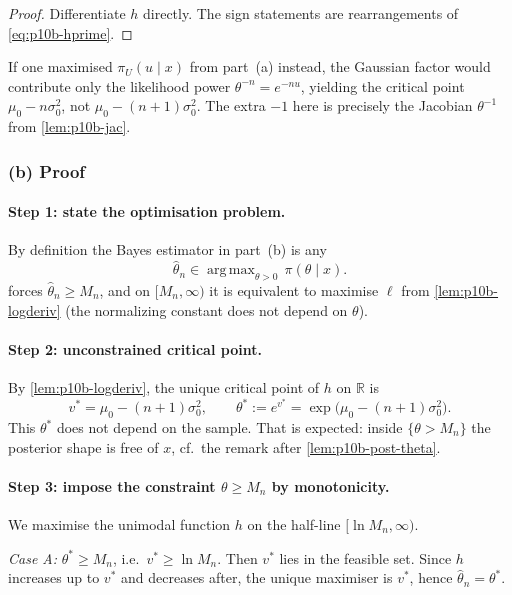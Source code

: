 \documentclass[11pt,a4paper]{article}
\DeclareMathOperator*{\argmax}{arg\,max}
\begin{document}
\begin{proof}
Differentiate \(h\) directly. The sign statements are rearrangements of \eqref{eq:p10b-hprime}.
\end{proof}

\begin{remark*}
If one maximised \(\pi_U(u\mid x)\) from part~(a) instead, the Gaussian factor would contribute only the likelihood power \(\theta^{-n}=e^{-nu}\), yielding the critical point \(\mu_0-n\sigma_0^2\), not \(\mu_0-(n+1)\sigma_0^2\). The extra \(-1\) here is precisely the Jacobian \(\theta^{-1}\) from \cref{lem:p10b-jac}.
\end{remark*}

\subsubsection{(b) Proof}

\paragraph{Step 1: state the optimisation problem.}
By definition the Bayes estimator in part~(b) is any
\[
\widehat\theta_n
\in
\argmax_{\theta>0}\,\pi(\theta\mid x).
\]
 forces \(\widehat\theta_n\ge M_n\), and on \([M_n,\infty)\) it is equivalent to maximise \(\ell\) from \cref{lem:p10b-logderiv} (the normalizing constant does not depend on \(\theta\)).

\paragraph{Step 2: unconstrained critical point.}
By \cref{lem:p10b-logderiv}, the unique critical point of \(h\) on \(\mathbb{R}\) is
\[
v^*=\mu_0-(n+1)\sigma_0^2,
\qquad
\theta^*
:=
e^{v^*}
=
\exp\bigl(\mu_0-(n+1)\sigma_0^2\bigr).
\]
This \(\theta^*\) does not depend on the sample. That is expected: inside \(\{\theta>M_n\}\) the posterior shape is free of \(x\), cf.\ the remark after \cref{lem:p10b-post-theta}.

\paragraph{Step 3: impose the constraint \(\theta\ge M_n\) by monotonicity.}
We maximise the unimodal function \(h\) on the half-line \([\ln M_n,\infty)\).

\textit{Case A:} \(\theta^*\ge M_n\), i.e.\ \(v^*\ge\ln M_n\). Then \(v^*\) lies in the feasible set. Since \(h\) increases up to \(v^*\) and decreases after, the unique maximiser is \(v^*\), hence \(\widehat\theta_n=\theta^*\).
\end{document}
